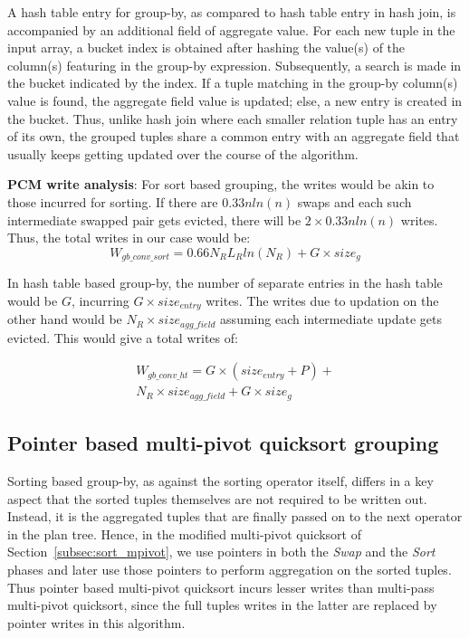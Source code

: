 A hash table entry for group-by, as compared to hash table entry in hash join, is accompanied by an additional field of aggregate value. For each new tuple in the input array, a bucket index is obtained after hashing the value(s) of the column(s) featuring in the group-by expression. Subsequently, a search is made in the bucket indicated by the index. If a tuple matching in the group-by column(s) value is found, the aggregate field value is updated; else, a new entry is created in the bucket. Thus, unlike hash join where each smaller relation tuple has an entry of its own, the grouped tuples share a common entry with an aggregate field that usually keeps getting updated over the course of the algorithm.

\textbf{PCM write analysis}: For sort based grouping, the writes would be akin to those incurred for sorting. If there are $0.33nln(n)$ \cite{swaps} swaps and each such intermediate swapped pair gets evicted, there will be $2 \times 0.33nln(n)$ writes. Thus, the total writes in our case would be:
\begin{equation}
\label{eq:gby_conv_sort}
W_{gb\_conv\_sort} = 0.66 N_R L_R ln(N_R) + G \times size_g
\end{equation}	

In hash table based group-by, the number of separate entries in the hash table would be $G$, incurring $G \times size_{entry}$ writes. The writes due to updation on the other hand would be $N_R \times size_{agg\_field}$ assuming each intermediate update gets evicted. This would give a total writes of:

\begin{equation}
\label{eq:gby_conv_ht}
\begin{split}
W_{gb\_conv\_ht} = G \times (size_{entry} + P) + \\
N_R \times size_{agg\_field} + G \times size_g
\end{split}
\end{equation}

\subsection{Pointer based multi-pivot quicksort grouping}
\label{subsec:gb_ptr_mpivot} 
Sorting based group-by, as against the sorting operator itself, differs in a key aspect that the sorted tuples themselves are not required to be written out. Instead, it is the aggregated tuples that are finally passed on to the next operator in the plan tree. Hence, in the modified multi-pivot quicksort of Section~\ref{subsec:sort_mpivot}, we use pointers in both the \textit{Swap} and the \textit{Sort} phases and later use those pointers to perform aggregation on the sorted tuples. Thus pointer based multi-pivot quicksort incurs lesser writes than multi-pass multi-pivot quicksort, since the full tuples writes in the latter are replaced by pointer writes in this algorithm.

